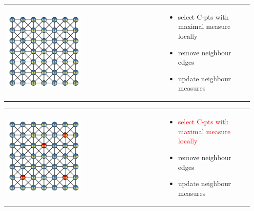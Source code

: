\documentclass[12pt]{beamer}
\newcommand{\re}[1]{{\textcolor{red}       {#1}}}
\begin{document}
\begin{frame}

\begin{tabular}{ p{} p{}}

\hspace{5mm} \includegraphics[width=0.48\textwidth]{PAMG1.png} &

\vspace{-1.75in}

\begin{itemize}
  \item select C-pts with maximal measure locally
  \item remove neighbour edges
  \item update neighbour measures

\end{itemize}

\end{tabular}

\end{frame}

\begin{frame}


\begin{tabular}{ p{} p{}}

\hspace{5mm} \includegraphics[width=0.48\textwidth]{PAMG2.png} &

\vspace{-1.75in}

\begin{itemize}
  \item \re{select C-pts with maximal measure locally}
  \item remove neighbour edges
  \item update neighbour measures

\end{itemize}
\end{tabular}

\end{frame}
\end{document}
